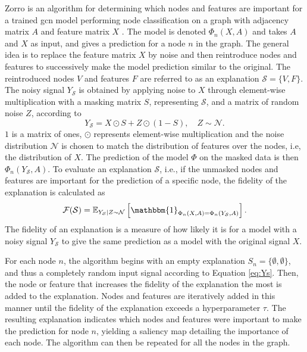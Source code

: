 Zorro is an algorithm for determining which nodes and features are important for a trained \acrshort{gcn} model performing node classification on a graph with adjacency matrix $A$ and feature matrix $X$ \cite{zorro}. The model is denoted $\Phi_n(X,A)$ and takes $A$ and $X$ as input, and gives a prediction for a node $n$ in the graph. The general idea is to replace the feature matrix $X$ by noise and then reintroduce nodes and features to successively make the model prediction similar to the original. The reintroduced nodes $V$ and features $F$ are referred to as an explanation $\mathcal{S} = \{V, F\}$. The noisy signal $Y_{\mathcal{S}}$ is obtained by applying noise to $X$ through element-wise multiplication with a masking matrix $S$, representing $\mathcal{S}$, and a matrix of random noise $Z$, according to
\begin{equation}
    Y_\mathcal{S} = X \odot S + Z \odot (1 - S), \quad Z \sim \mathcal{N}.
\end{equation}
$1$ is a matrix of ones, $\odot$ represents element-wise multiplication and the noise distribution $\mathcal{N}$ is chosen to match the distribution of features over the nodes, i.e, the distribution of $X$. The prediction of the model $\Phi$ on the masked data is then $\Phi_n(Y_{\mathcal{S}}, A)$. To evaluate an explanation $\mathcal{S}$, i.e., if the unmasked nodes and features are important for the prediction of a specific node, the fidelity of the explanation is calculated as
\begin{equation}
    \mathcal{F}(\mathcal{S}) = \mathbb{E}_{Y_{\mathcal{S}}|Z\sim\mathcal{N}}\left[\mathbbm{1}_{\Phi_n(X,A) = \Phi_n(Y_{\mathcal{S}},A)}\right].
    \label{eq:Ys}
\end{equation}
The fidelity of an explanation is a measure of how likely it is for a model with a noisy signal $Y_{\mathcal{S}}$ to give the same prediction as a model with the original signal $X$.

For each node $n$, the algorithm begins with an empty explanation $S_n = \{\emptyset, \emptyset\}$, and thus a completely random input signal according to Equation \eqref{eq:Ys}. Then, the node or feature that increases the fidelity of the explanation the most is added to the explanation. Nodes and features are iteratively added in this manner until the fidelity of the explanation exceeds a hyperparameter $\tau$. The resulting explanation indicates which nodes and features were important to make the prediction for node $n$, yielding a saliency map detailing the importance of each node. The algorithm can then be repeated for all the nodes in the graph.

